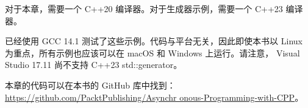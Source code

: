 对于本章，需要一个 C++20 编译器。对于生成器示例，需要一个 C++23 编译器。

已经使用 GCC 14.1 测试了这些示例。代码与平台无关，因此即使本书以 Linux 为重点，所有示例也应该可以在 macOS 和 Windows 上运行。请注意， Visual Studio 17.11 尚不支持 C++23 std::generator。

本章的代码可以在本书的 GitHub 库中找到： \url{https://github.com/PacktPublishing/Asynchr onous-Programming-with-CPP}。